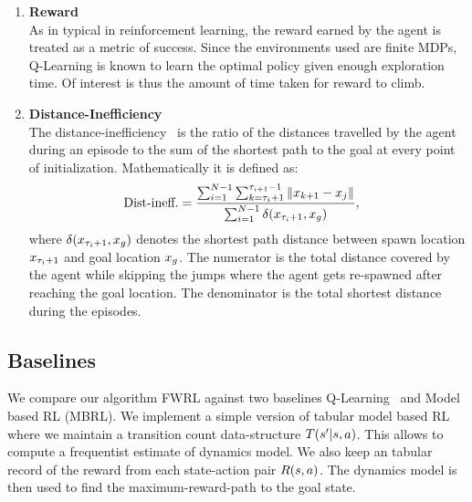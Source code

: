 \begin{enumerate}
    \item \textbf{Reward}\\\noindent
        As in typical in reinforcement learning, the reward earned by
        the agent is treated as a metric of success. Since the
        environments used are finite MDPs, Q-Learning is known to learn
        the optimal policy given enough exploration time. Of interest is
        thus the amount of time taken for reward to climb.



    \item \textbf{Distance-Inefficiency}\\
      The distance-inefficiency~\citep{dhiman2018critical} is the ratio of the
      distances travelled by the agent during an episode to the sum of the shortest
      path to the goal at every point of initialization. Mathematically it is defined
      as:
		\begin{align}
			\text{Dist-ineff.} &=
			\frac{ \sum_{i=1}^{N-1} \sum_{k=\tau_i + 1}^{\tau_{i+1} - 1} \|x_{k+1} - x_{j}\| }
			{ \sum_{i=1}^{N-1} \delta(x_{\tau_i + 1}, x_g) } ,
		\end{align}%
		where $\delta(x_{\tau_i +1}, x_g)$ denotes the shortest path
		distance between spawn location $x_{\tau_i+1}$ and goal location
        $x_g$. The numerator is the total distance covered by the agent while
        skipping the jumps where the agent gets re-spawned after reaching the
        goal location. The denominator is the total shortest distance during the
        episodes.
\end{enumerate}

\subsection{Baselines}
We compare our algorithm FWRL against two baselines
Q-Learning~\cite{watkins1992qlearning} and Model based RL (MBRL).
We implement a simple version of tabular model based RL where we maintain a
transition count data-structure $T(s' | s, a)$.
This allows to compute a frequentist estimate of dynamics model.
We also keep an tabular record of the reward from each state-action pair
$R(s, a)$. The dynamics model is then used to find the
maximum-reward-path to the goal state.

